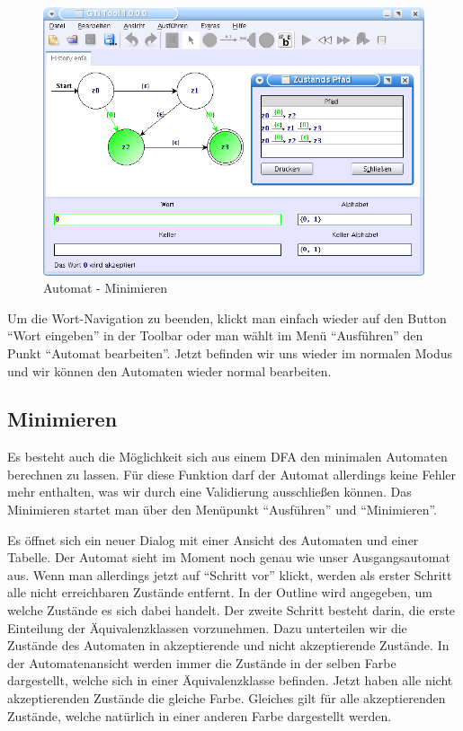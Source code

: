     \begin{figure}[h]
  \begin{center}
  \includegraphics[width=12cm]{../images/history_path.png}
  \caption{Automat - Minimieren}
  \end{center}
  \end{figure}
  
  Um die Wort-Navigation zu beenden, klickt man einfach wieder auf den Button
  "`Wort eingeben"' in der Toolbar oder man wählt im Menü "`Ausführen"' den
  Punkt "`Automat bearbeiten"'. Jetzt befinden wir uns wieder im normalen Modus
  und wir können den Automaten wieder normal bearbeiten.
   
\subsection{Minimieren}
  
  Es besteht auch die Möglichkeit sich aus einem DFA den minimalen Automaten
  berechnen zu lassen. Für diese Funktion darf der Automat allerdings keine
  Fehler mehr enthalten, was wir durch eine Validierung ausschließen können. Das
  Minimieren startet man über den Menüpunkt "`Ausführen"' und
  "`Minimieren"'.\vspace{10pt}
  
  Es öffnet sich ein neuer Dialog mit einer Ansicht des Automaten und einer
  Tabelle. Der Automat sieht im Moment noch genau wie unser Ausgangsautomat
  aus. Wenn man allerdings jetzt auf "`Schritt vor"' klickt, werden als erster
  Schritt alle nicht erreichbaren Zustände entfernt. In der Outline wird
  angegeben, um welche Zustände es sich dabei handelt. Der zweite Schritt
  besteht darin, die erste Einteilung der Äquivalenzklassen vorzunehmen. Dazu
  unterteilen wir die Zustände des Automaten in akzeptierende und nicht
  akzeptierende Zustände. In der Automatenansicht werden immer die Zustände in
  der selben Farbe dargestellt, welche sich in einer Äquivalenzklasse befinden.
  Jetzt haben alle nicht akzeptierenden Zustände die gleiche Farbe. Gleiches 
  gilt für alle akzeptierenden Zustände, welche natürlich in einer anderen
  Farbe dargestellt werden.\vspace{10pt}
  

